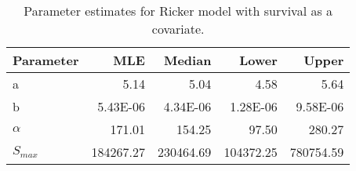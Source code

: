 \begin{table}[ht]
\centering
\caption{Parameter estimates for Ricker model with survival as a covariate.} 
\begin{tabular}{lrrrr}
  \hline
Parameter & MLE & Median & Lower & Upper \\ 
  \hline
a & 5.14 & 5.04 & 4.58 & 5.64 \\ 
  b & 5.43E-06 & 4.34E-06 & 1.28E-06 & 9.58E-06 \\ 
  $\alpha$ & 171.01 & 154.25 & 97.50 & 280.27 \\ 
  $S_{max}$ & 184267.27 & 230464.69 & 104372.25 & 780754.59 \\ 
   \hline
\end{tabular}
\end{table}
